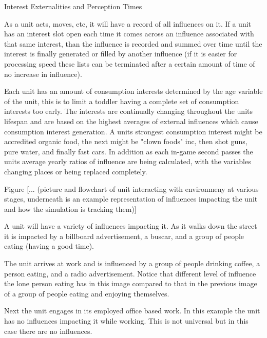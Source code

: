 Interest Externalities and Perception Times



As a unit acts, moves, etc, it will have a record of all influences on it. If a unit has an interest slot open each time it comes across an influence associated with that same interest, than the influence is recorded and summed over time until the interest is finally generated or filled by another influence (if it is easier for processing speed these lists can be terminated after a certain amount of time of no increase in influence).

Each unit has an amount of consumption interests determined by the age variable of the unit, this is to limit a toddler having a complete set of consumption interests too early. The interests are continually changing throughout the units lifespan and are based on the highest averages of external influences which cause consumption interest generation. A units strongest consumption interest might be accredited organic food, the next might be "clown foods" inc, then shot guns, pure water, and finally fast cars. In addition as each in-game second passes the units average yearly ratios of influence are being calculated, with the variables changing places or being replaced completely.   
 

Figure [... (picture and flowchart of unit interacting with environmeny at various stages, underneath is an example representation of influences impacting the unit and how the simulation is tracking them)]

A unit will have a variety of influences impacting it. As it walks down the street it is impacted by a billboard advertisement, a buscar, and a group of people eating (having a good time).

The unit arrives at work and is influenced by a group of people drinking coffee, a person eating, and a radio advertisement. Notice that different level of influence the lone person eating has in this image compared to that in the previous image of a group of people eating and enjoying themselves.

Next the unit engages in its employed office based work. In this example the unit has no influences impacting it while working. This is not universal but in this case there are no influences.



